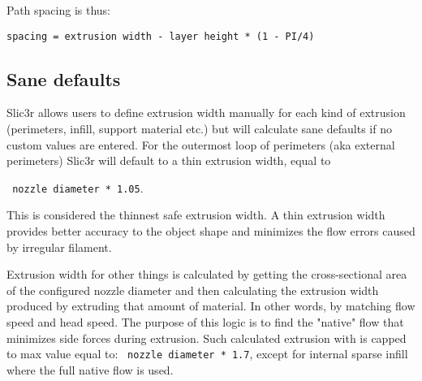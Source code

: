 Path spacing is thus:
\par \verb|spacing = extrusion width - layer height * (1 - PI/4)|

\subsection{Sane defaults}
\label{sec:sane_defaults}

Slic3r allows users to define extrusion width manually for each kind of extrusion (perimeters, infill, support material etc.) but will calculate sane defaults if no custom values are entered.
For the outermost loop of perimeters (aka external perimeters) Slic3r will default to a thin extrusion width, equal to 
\par \verb| nozzle diameter * 1.05|.

This is considered the thinnest safe extrusion width. A thin extrusion width provides better accuracy to the object shape and minimizes the flow errors caused by irregular filament.

Extrusion width for other things is calculated by getting the cross-sectional area of the configured nozzle diameter and then calculating the extrusion width produced by extruding that amount of material. In other words, by matching flow speed and head speed. The purpose of this logic is to find the "native" flow that minimizes side forces during extrusion. Such calculated extrusion with is capped to max value equal to:
\verb| nozzle diameter * 1.7|, except for internal sparse infill where the full native flow is used.
